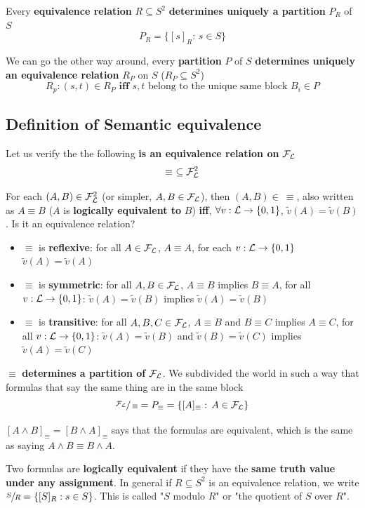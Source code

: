	\noindent
	Every \textbf{equivalence relation} $R \subseteq S^2$ \textbf{determines uniquely a partition} $P_R$ of $S$
	$$ P_R = \{[s]_R : \, s \in S \}$$

	\noindent
	We can go the other way around, every \textbf{partition} $P$ of $S$ \textbf{determines uniquely an equivalence relation} $R_P$ on $S$ ($R_P \subseteq S^2$)
	$$ R_p : (s,t) \in R_P \textbf{ iff } s,t \text{ belong to the unique same block } B_i \in P$$

	\subsection{Definition of Semantic equivalence}
	Let us verify the the following \textbf{is an equivalence relation on} $\mathcal{F}_\mathcal{L}$
	$$ \equiv \ \subseteq \mathcal{F}_\mathcal{L}^2$$

	\noindent
	For each $(A, B) \in \mathcal{F}_\mathcal{L}^2$ (or simpler, $A, B \in \mathcal{F}_\mathcal{L}$), then $(A, B) \in \ \equiv$, also written as $A \equiv B$ ($A$ is \textbf{logically equivalent to} $B$) \textbf{iff}, $\forall v: \mathcal{L} \rightarrow \{0,1\}$, $\tilde{v}(A) = \tilde{v} (B)$. Is it an equivalence relation?
	\begin{itemize}
		\item $\equiv$ is \textbf{reflexive}: for all $A \in \mathcal{F}_\mathcal{L}$, $A \equiv A$, for each $v: \mathcal{L} \rightarrow \{0,1\}$ $\tilde{v} (A) = \tilde{v}(A)$

		\item $\equiv$ is \textbf{symmetric}: for all $A,B \in \mathcal{F}_\mathcal{L}$, $A \equiv B$ implies $B \equiv A$, for all $v: \mathcal{L} \rightarrow \{0,1\}$: $\tilde{v}(A) = \tilde{v}(B)$ implies $\tilde{v}(A) = \tilde{v}(B)$

		\item $\equiv$ is \textbf{transitive}: for all $A,B,C \in \mathcal{F}_\mathcal{L}$, $A \equiv B$ and $B \equiv C$ implies $A \equiv C$, for all $v: \mathcal{L} \rightarrow \{0,1\}$: $\tilde{v}(A) = \tilde{v}(B)$ and $\tilde{v}(B) = \tilde{v}(C)$ implies $\tilde{v}(A) = \tilde{v}(C)$
	\end{itemize}

	\noindent
	$\equiv$ \textbf{determines a partition of} $\mathcal{F}_\mathcal{L}$. We subdivided the world in such a way that formulas that say the same thing are in the same block
	$$  \sfrac{\mathcal{F}_\mathcal{L}}{\equiv} = P_\equiv = \{[A]_\equiv : \, A \in \mathcal{F}_\mathcal{L}\}$$

	$[A \wedge B]_\equiv = [B \wedge A]_\equiv$ says that the formulas are equivalent, which is the same as saying $A \wedge B \equiv B \wedge A$.

	Two formulas are \textbf{logically equivalent} if they have the \textbf{same truth value under any assignment}. In general if $R \subseteq S^2$ is an equivalence relation, we write $\sfrac{S}{R} = \{[S]_R : s \in S\}$. This is called "$S$ modulo $R$" or "the quotient of $S$ over $R$".

